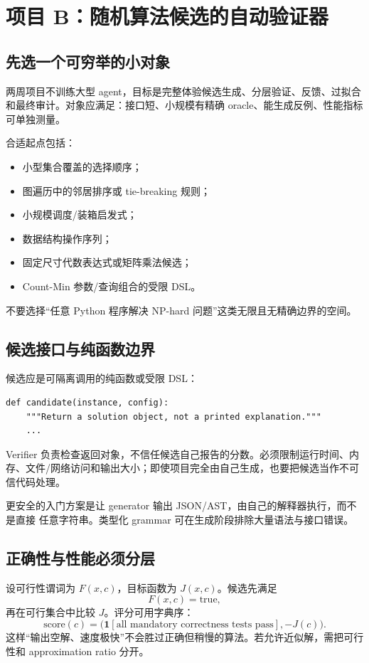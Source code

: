 \chapter{项目 B：随机算法候选的自动验证器}

\section{先选一个可穷举的小对象}

两周项目不训练大型 agent，目标是完整体验候选生成、分层验证、反馈、过拟合和最终审计。对象应满足：接口短、小规模有精确 oracle、能生成反例、性能指标可单独测量。

合适起点包括：
\begin{itemize}
  \item 小型集合覆盖的选择顺序；
  \item 图遍历中的邻居排序或 tie-breaking 规则；
  \item 小规模调度/装箱启发式；
  \item 数据结构操作序列；
  \item 固定尺寸代数表达式或矩阵乘法候选；
  \item Count-Min 参数/查询组合的受限 DSL。
\end{itemize}
不要选择“任意 Python 程序解决 NP-hard 问题”这类无限且无精确边界的空间。

\section{候选接口与纯函数边界}

候选应是可隔离调用的纯函数或受限 DSL：
\begin{lstlisting}
def candidate(instance, config):
    """Return a solution object, not a printed explanation."""
    ...
\end{lstlisting}
Verifier 负责检查返回对象，不信任候选自己报告的分数。必须限制运行时间、内存、文件/网络访问和输出大小；即使项目完全由自己生成，也要把候选当作不可信代码处理。

更安全的入门方案是让 generator 输出 JSON/AST，由自己的解释器执行，而不是直接  任意字符串。类型化 grammar 可在生成阶段排除大量语法与接口错误。

\section{正确性与性能必须分层}

设可行性谓词为 $F(x,c)$，目标函数为 $J(x,c)$。候选先满足
\[
F(x,c)=\mathrm{true},
\]
再在可行集合中比较 $J$。评分可用字典序：
\[
\mathrm{score}(c)=
\bigl(\mathbf{1}[\text{all mandatory correctness tests pass}],
-J(c)\bigr).
\]
这样“输出空解、速度极快”不会胜过正确但稍慢的算法。若允许近似解，需把可行性和 approximation ratio 分开。

